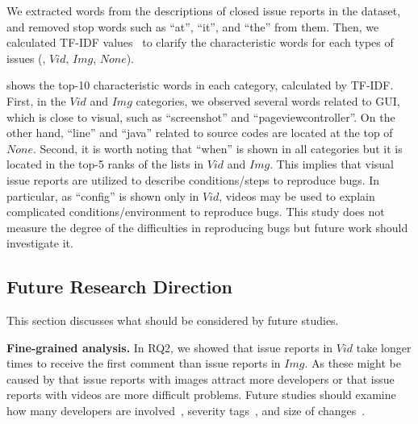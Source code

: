 We extracted words from the descriptions of closed issue reports in the dataset, and  removed stop words such as ``at'', ``it'', and ``the'' from them. 
Then, we calculated TF-IDF values~\citep{salton1988-tfidf} to clarify the characteristic words for each types of issues (\ie, $Vid$, $Img$, $None$). 

 shows the top-10 characteristic words in each category, calculated by TF-IDF.
First, in the $Vid$ and $Img$ categories, we observed several words related to GUI, which is close to visual, such as ``screenshot'' and ``pageviewcontroller''. 
On the other hand, ``line'' and ``java'' related to source codes are located at the top of $None$.
Second, it is worth noting that ``when'' is shown in all categories but it is located in the top-5 ranks of the lists in $Vid$ and $Img$.
This implies that visual issue reports are utilized to describe conditions/steps to reproduce bugs. In particular, as ``config'' is shown only in $Vid$, videos may be used to explain complicated conditions/environment to reproduce bugs. This study does not measure the degree of the difficulties in reproducing bugs but future work should investigate it.



\subsection{Future Research Direction}
This section discusses what should be considered by future studies. 

\noindent
\textbf{Fine-grained analysis. }
In RQ2, we showed that issue reports in $Vid$ take longer times to receive the first comment than issue reports in $Img$. 
As these might be caused by that issue reports with images attract more developers or that issue reports with videos are more difficult problems.
Future studies should examine how many developers are involved~\citep{DBLP:conf/icsm/BavotaR15}, severity tags~\citep{DBLP:conf/issre/ZhouNG15}, and size of changes~\citep{DBLP:conf/kbse/HattoriL08}.

